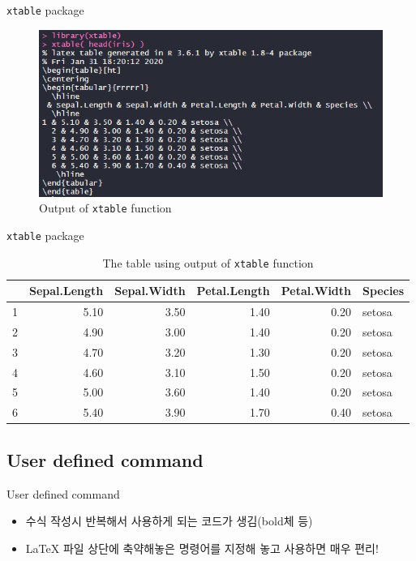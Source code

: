 \documentclass{beamer}
\begin{document}
\begin{frame}{\texttt{xtable} package}
	\begin{figure}[h] %
		\begin{center}
			\includegraphics[width=0.9\linewidth]{img/xtable2.png}
		\end{center}
		\caption{Output of \texttt{xtable} function}
		\label{fig:long}
		\label{fig:onecol}
	\end{figure}
\end{frame}

\begin{frame}{\texttt{xtable} package}
	\begin{table}[ht]
		\centering
		\tiny
		\begin{tabular}{rrrrrl}
			\hline
			& Sepal.Length & Sepal.Width & Petal.Length & Petal.Width & Species \\ 
			\hline
			1 & 5.10 & 3.50 & 1.40 & 0.20 & setosa \\ 
			2 & 4.90 & 3.00 & 1.40 & 0.20 & setosa \\ 
			3 & 4.70 & 3.20 & 1.30 & 0.20 & setosa \\ 
			4 & 4.60 & 3.10 & 1.50 & 0.20 & setosa \\ 
			5 & 5.00 & 3.60 & 1.40 & 0.20 & setosa \\ 
			6 & 5.40 & 3.90 & 1.70 & 0.40 & setosa \\ 
			\hline
		\end{tabular}
	\caption{The table using output of \texttt{xtable} function}
	\end{table}
\end{frame}


\subsection{User defined command}

\begin{frame}{User defined command}
	\begin{itemize}
		\item {
			수식 작성시 반복해서 사용하게 되는 코드가 생김(bold체 등)
		}
		\item {
			\textrm{\LaTeX} 파일 상단에 축약해놓은 명령어를 지정해 놓고 사용하면 매우 편리!
		}
	\end{itemize}
\end{frame}
\end{document}
